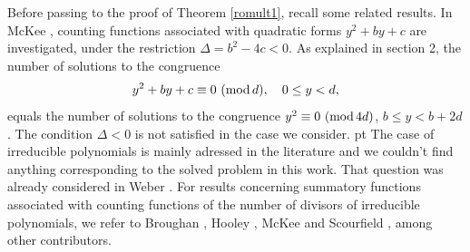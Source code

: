 \documentclass[11pt,draft,reqno]{amsart}
\theoremstyle{definition}
\theoremstyle{remarks}
\numberwithin{equation}{section}
\def \D{{\Delta}}
\begin{document}
    Before passing to the proof of Theorem \ref{romult1}, recall some related results. In McKee \cite{McK},   counting functions   associated with   quadratic forms $y^2 + by+c$ are investigated, under the restriction $\D= b^2 -4c<0$. As explained in section 2,  the number of solutions to the  congruence
 $$y^2 + by+c\equiv 0 \ {\rm (mod}\, d{\rm )}, \quad 0\le y<d,$$
 equals the number of solutions to the  congruence
 $y^2 \equiv 0 \ {\rm (mod}\, 4d{\rm )}$, $b\le y<b+2d$.  The condition $\D <0$ is not satisfied in the case we consider.   
    pt
   The case of irreducible polynomials is mainly adressed in the literature and we couldn't find anything corresponding to the solved problem   in this work.    That question was already considered in Weber \cite{W4}.  For results concerning summatory functions associated with counting functions of the number of divisors of irreducible polynomials, we refer to Broughan \cite{Br}, Hooley \cite{Ho}, McKee \cite{McK1} and Scourfield \cite{S}, among  other contributors.  
\end{document}
